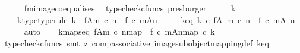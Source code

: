 \begin{isabellebody}
\ \ \ \ \isamarkupfalse%
\ f{\isacharunderscore}{\kern0pt}m{\isacharunderscore}{\kern0pt}image{\isacharunderscore}{\kern0pt}coequalises\ \isamarkupfalse%
\ {\isacharparenleft}{\kern0pt}typecheck{\isacharunderscore}{\kern0pt}cfuncs{\isacharcomma}{\kern0pt}\ presburger{\isacharparenright}{\kern0pt}\isanewline
\ \ \isamarkupfalse%
\ \isamarkupfalse%
\ k{\isacharprime}{\kern0pt}\ \ \isanewline
\ \ \ \ k{\isacharprime}{\kern0pt}{\isacharunderscore}{\kern0pt}type{\isacharbrackleft}{\kern0pt}type{\isacharunderscore}{\kern0pt}rule{\isacharbrackright}{\kern0pt}{\isacharcolon}{\kern0pt}\ {\isachardoublequoteopen}k{\isacharprime}{\kern0pt}\ {\isacharcolon}{\kern0pt}\ f{\isasymlparr}A{\isasymrparr}\isactrlbsub m\ {\isasymcirc}\isactrlsub c\ n\isactrlesub \ {\isasymrightarrow}\ {\isacharparenleft}{\kern0pt}f\ {\isasymcirc}\isactrlsub c\ m{\isacharparenright}{\kern0pt}{\isasymlparr}A{\isasymrparr}\isactrlbsub n\isactrlesub {\isachardoublequoteclose}\ \isanewline
\ \ \ \ k{\isacharprime}{\kern0pt}{\isacharunderscore}{\kern0pt}eq{\isacharcolon}{\kern0pt}\ {\isachardoublequoteopen}k{\isacharprime}{\kern0pt}\ {\isasymcirc}\isactrlsub c\ f{\isasymrestriction}\isactrlbsub {\isacharparenleft}{\kern0pt}A{\isacharcomma}{\kern0pt}\ m\ {\isasymcirc}\isactrlsub c\ n{\isacharparenright}{\kern0pt}\isactrlesub \ {\isacharequal}{\kern0pt}\ {\isacharparenleft}{\kern0pt}f\ {\isasymcirc}\isactrlsub c\ m{\isacharparenright}{\kern0pt}{\isasymrestriction}\isactrlbsub {\isacharparenleft}{\kern0pt}A{\isacharcomma}{\kern0pt}\ n{\isacharparenright}{\kern0pt}\isactrlesub {\isachardoublequoteclose}\isanewline
\ \ \ \ \isamarkupfalse%
\ auto\isanewline
\isanewline
\ \ \isamarkupfalse%
\ k{\isacharprime}{\kern0pt}{\isacharunderscore}{\kern0pt}maps{\isacharunderscore}{\kern0pt}eq{\isacharcolon}{\kern0pt}\ {\isachardoublequoteopen}{\isacharbrackleft}{\kern0pt}f{\isasymlparr}A{\isasymrparr}\isactrlbsub m\ {\isasymcirc}\isactrlsub c\ n\isactrlesub {\isacharbrackright}{\kern0pt}map\ {\isacharequal}{\kern0pt}\ {\isacharbrackleft}{\kern0pt}{\isacharparenleft}{\kern0pt}f\ {\isasymcirc}\isactrlsub c\ m{\isacharparenright}{\kern0pt}{\isasymlparr}A{\isasymrparr}\isactrlbsub n\isactrlesub {\isacharbrackright}{\kern0pt}map\ {\isasymcirc}\isactrlsub c\ k{\isacharprime}{\kern0pt}{\isachardoublequoteclose}\isanewline
\ \ \ \ \isamarkupfalse%
\ {\isacharparenleft}{\kern0pt}typecheck{\isacharunderscore}{\kern0pt}cfuncs{\isacharcomma}{\kern0pt}\ smt\ {\isacharparenleft}{\kern0pt}z{}{\isacharparenright}{\kern0pt}\ comp{\isacharunderscore}{\kern0pt}associative{}\ image{\isacharunderscore}{\kern0pt}subobject{\isacharunderscore}{\kern0pt}mapping{\isacharunderscore}{\kern0pt}def{}\ k{\isacharprime}{\kern0pt}{\isacharunderscore}{\kern0pt}eq{\isacharparenright}{\kern0pt}\isanewline

\end{isabellebody}
